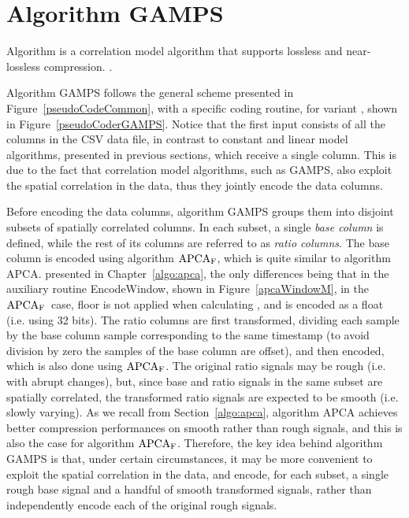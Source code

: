 
\clearpage

\section{Algorithm GAMPS}
\label{algo:gamps}
\newcommand{\apcaF}{$\textnormal{APCA}_\textnormal{F}$}


\vspace{-5pt}
Algorithm \textit{\GAMPSfull} \cite{coder:gamps} is a correlation model algorithm that supports lossless and near-lossless compression. \WindowParam {}.


Algorithm GAMPS follows the general scheme presented in Figure~\ref{pseudoCodeCommon}, with a specific coding routine, for variant \maskalgo, shown in Figure~\ref{pseudoCoderGAMPS}. Notice that the first input consists of all the columns in the CSV data file, in contrast to constant and linear model algorithms, presented in previous sections, which receive a single column. This is due to the fact that correlation model algorithms, such as GAMPS, also exploit the spatial correlation in the data, thus they jointly encode the data columns. 


Before encoding the data columns, algorithm GAMPS groups them into disjoint subsets of spatially correlated columns. In each subset, a single \textit{base column} is defined, while the rest of its columns are referred to as \textit{ratio columns}. The base column is encoded using algorithm \apcaF, which is quite similar to algorithm APCA. presented in Chapter~\ref{algo:apca}, the only differences being that in the auxiliary routine EncodeWindow, shown in Figure~\ref{apcaWindowM}, in the \apcaF\ case, floor is not applied when calculating \midrange, and \midrange is encoded as a float (i.e. using 32 bits). The ratio columns are first transformed, dividing each sample by the base column sample corresponding to the same timestamp (to avoid division by zero the samples of the base column are offset), and then encoded, which is also done using \apcaF. The original ratio signals may be rough (i.e. with abrupt changes), but, since base and ratio signals in the same subset are spatially correlated, the transformed ratio signals are expected to be smooth (i.e. slowly varying). As we recall from Section~\ref{algo:apca}, algorithm APCA achieves better compression performances on smooth rather than rough signals, and this is also the case for algorithm \apcaF. Therefore, the key idea behind algorithm GAMPS is that, under certain circumstances, it may be more convenient to exploit the spatial correlation in the data, and encode, for each subset, a single rough base signal and a handful of smooth transformed signals, rather than independently encode each of the original rough signals.


